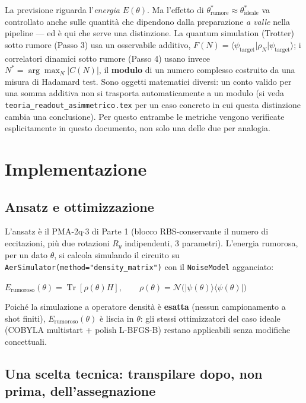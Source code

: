 \documentclass[11pt,a4paper]{article}
\newcommand{\Tr}{\operatorname{Tr}}
\newcommand{\ket}[1]{\lvert #1 \rangle}
\newcommand{\bra}[1]{\langle #1 \rvert}
\begin{document}
La previsione riguarda l'\emph{energia} $E(\theta)$. Ma l'effetto di
$\theta^*_\text{rumore}\approx\theta^*_\text{ideale}$ va controllato anche
sulle quantità che dipendono dalla preparazione \emph{a valle} nella
pipeline --- ed è qui che serve una distinzione. La quantum simulation
(Trotter) sotto rumore (Passo 3) usa un osservabile additivo, $F(N)=\bra{\psi_\text{target}}\rho_N\ket{\psi_\text{target}}$;
i correlatori dinamici sotto rumore (Passo 4) usano invece $N^*=\arg\max_N|C(N)|$, il
\textbf{modulo} di un numero complesso costruito da una misura di
Hadamard test. Sono oggetti matematici diversi: un conto valido per una
somma additiva non si trasporta automaticamente a un modulo (si veda
\texttt{teoria\_readout\_asimmetrico.tex} per un caso concreto in cui
questa distinzione cambia una conclusione). Per questo entrambe le
metriche vengono verificate esplicitamente in questo documento, non solo
una delle due per analogia.

\section{Implementazione}

\subsection{Ansatz e ottimizzazione}

L'ansatz è il PMA-2q$\cdot$3 di Parte 1 (blocco RBS-conservante il
numero di eccitazioni, più due rotazioni $R_y$ indipendenti, 3
parametri). L'energia rumorosa, per un dato $\theta$, si calcola
simulando il circuito su \texttt{AerSimulator(method="density\_matrix")}
con il \texttt{NoiseModel} agganciato:
\begin{keyeq}
\centering
$E_\text{rumoroso}(\theta) = \Tr[\rho(\theta) H], \qquad \rho(\theta) = \mathcal{N}\!\big(\ket{\psi(\theta)}\bra{\psi(\theta)}\big)$
\end{keyeq}
Poiché la simulazione a operatore densità è \textbf{esatta} (nessun
campionamento a shot finiti), $E_\text{rumoroso}(\theta)$ è liscia in
$\theta$: gli stessi ottimizzatori del caso ideale (COBYLA multistart +
polish L-BFGS-B) restano applicabili senza modifiche concettuali.

\subsection{Una scelta tecnica: transpilare dopo, non prima, dell'assegnazione}
\label{sec:trappola}
\end{document}
